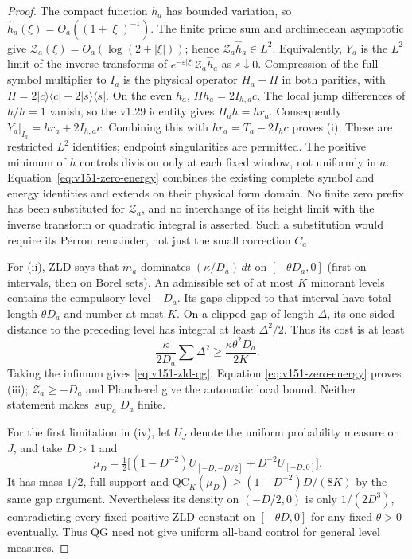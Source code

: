 \begin{proof}
The compact function $h_a$ has bounded variation, so
$\widehat h_a(\xi)=O_a((1+|\xi|)^{-1})$. The finite prime sum and
archimedean asymptotic give
$\mathcal Z_a(\xi)=O_a(\log(2+|\xi|))$; hence
$\mathcal Z_a\widehat h_a\in L^2$. Equivalently, $Y_a$ is the
$L^2$ limit of the inverse transforms of
$e^{-\varepsilon|\xi|}\mathcal Z_a\widehat h_a$ as
$\varepsilon\downarrow0$.
Compression of the full symbol multiplier to $I_a$ is the physical
operator $H_a+\Pi$ in both parities, with
$\Pi=2|c\rangle\langle c|-2|s\rangle\langle s|$.
On the even $h_a$, $\Pi h_a=2I_{h,a}c$. The local jump differences
of $h/h=1$ vanish, so the v1.29 identity gives $H_a h=h r_a$.
Consequently $Y_a|_{I_a}=h r_a+2I_{h,a}c$. Combining this with
$h r_a=T_a-2I_hc$ proves (i). These are restricted $L^2$ identities;
endpoint singularities are permitted. The positive minimum of $h$
controls division only at each fixed window, not uniformly in $a$.
Equation~\eqref{eq:v151-zero-energy} combines the existing complete
symbol and energy identities and extends on their physical form domain.
No finite zero prefix has been substituted for $\mathcal Z_a$, and
no interchange of its height limit with the inverse transform or
quadratic integral is asserted. Such a substitution would require its
Perron remainder, not just the small correction $C_a$.

For (ii), ZLD says that $\widetilde m_a$ dominates
$(\kappa/D_a)\,dt$ on $[-\theta D_a,0]$ (first on intervals,
then on Borel sets). An admissible set of at most $K$ minorant levels
contains the compulsory level $-D_a$. Its gaps clipped to that interval
have total length $\theta D_a$ and number at most $K$. On a clipped
gap of length $\Delta$, its one-sided distance to the preceding
level has integral at least $\Delta^2/2$. Thus its cost is at least
\[
 \frac{\kappa}{2D_a}\sum\Delta^2
 \ge\frac{\kappa\theta^2D_a}{2K}.
\]
Taking the infimum gives \eqref{eq:v151-zld-qg}. Equation
\eqref{eq:v151-zero-energy} proves (iii); $\mathcal Z_a\ge-D_a$
and Plancherel give the automatic local bound. Neither statement
makes $\sup_aD_a$ finite.

For the first limitation in (iv), let $U_J$ denote the uniform
probability measure on $J$, and take $D>1$ and
\[
 \mu_D=\tfrac12\bigl[(1-D^{-2})U_{[-D,-D/2]}
                         +D^{-2}U_{[-D,0]}\bigr].
\]
It has mass $1/2$, full support and
$\mathrm{QC}_K(\mu_D)\ge(1-D^{-2})D/(8K)$ by the same gap
argument. Nevertheless its density on $(-D/2,0)$ is only
$1/(2D^3)$, contradicting every fixed positive ZLD constant on
$[-\theta D,0]$ for any fixed $\theta>0$ eventually. Thus QG need
not give uniform all-band control for general level measures.


\end{proof}
